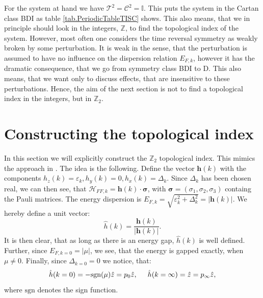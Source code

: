 For the system at hand we have $\mathcal{T}^2 = \mathcal{C}^2 = \mathbb{I}$. This puts the system in the Cartan class BDI as table \ref{tab.PeriodicTableTISC} shows. This also means, that we in principle should look in the integers, $\mathbb{Z}$, to find the topological index of the system. However, most often one considers the time reversal symmetry as weakly broken by some perturbation. It is weak in the sense, that the perturbation is assumed to have no influence on the dispersion relation $E_{F,k}$, however it has the dramatic consequence, that we go from symmetry class BDI to D. This also means, that we want only to discuss effects, that are insensitive to these perturbations. Hence, the aim of the next section is not to find a topological index in the integers, but in $\mathbb{Z}_2$. 

\section{Constructing the topological index}
In this section we will explicitly construct the $\mathbb{Z}_2$ topological index. This mimics the approach in \cite{Alicea}. The idea is the following. Define the vector $\mathbf{h}(k)$ with the components $h_z(k) = \varepsilon_k, h_y(k) = 0, h_x(k) = \Delta_k$. Since $\Delta_k$ has been chosen real, we can then see, that $\mathcal{H}_{FF,k} = \mathbf{h}(k)\cdot\boldsymbol\sigma$, with $\boldsymbol\sigma = (\sigma_1,\sigma_2,\sigma_3)$ containg the Pauli matrices. The energy dispersion is $E_{F,k} = \sqrt{\varepsilon^2_k + \Delta^2_k} = |\mathbf{h}(k)|$. We hereby define a unit vector:
\begin{equation}
\hat{h}(k) = \frac{\mathbf{h}(k)}{|\mathbf{h}(k)|}. 
\label{eq.hhatdefinition}
\end{equation}
It is then clear, that as long as there is an energy gap, $\hat{h}(k)$ is well defined. Further, since $E_{F,k=0} = |\mu|$, we see, that the energy is gapped exactly, when $\mu \neq 0$. Finally, since $\Delta_{k=0} = 0$ we notice, that: 
\begin{equation}
\hat{h}(k=0) = -\text{sgn}(\mu)\hat{z} = p_0\hat{z}, \hspace{0.5cm} \hat{h}(k=\infty) = \hat{z} = p_{\infty}\hat{z},
\label{eq.hhatk0kinfty}
\end{equation}
where $\text{sgn}$ denotes the sign function. 

